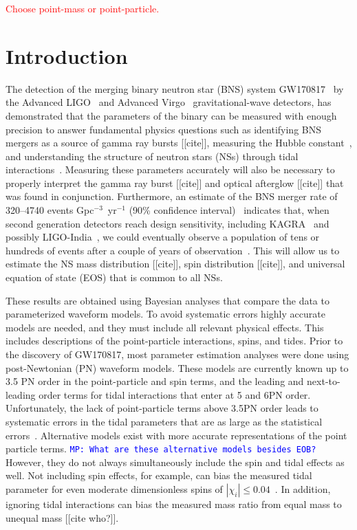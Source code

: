 \documentclass[prd,aps,letter,twocolumn,floatfix,notitlepage,nofootinbib]{revtex4-1}
\newcommand{\MP}[1]{{\textcolor{blue}{\texttt{MP: #1}} }}
\newcommand{\red}[1]{\textcolor{red}{#1}}
\begin{document}
\red{Choose point-mass or point-particle.}
\section{Introduction}

The detection of the merging binary neutron star (BNS) system GW170817~\cite{GW170817} by the Advanced LIGO~\cite{Harry2010} and Advanced Virgo~\cite{Acernese2009} gravitational-wave detectors, has demonstrated that the parameters of the binary can be measured with enough precision to answer fundamental physics questions such as identifying BNS mergers as a source of gamma ray bursts [[cite]], measuring the Hubble constant~\cite{GW170817Hubble}, and understanding the structure of neutron stars (NSs) through tidal interactions~\cite{GW170817}. Measuring these parameters accurately will also be necessary to properly interpret the gamma ray burst [[cite]] and optical afterglow [[cite]] that was found in conjunction. Furthermore, an estimate of the BNS merger rate of 320--4740 events Gpc$^{-3}$~yr$^{-1}$ (90\% confidence interval)~\cite{GW170817} indicates that, when second generation detectors reach design sensitivity, including KAGRA~\cite{Somiya2012} and possibly LIGO-India~\cite{IyerSouradeepUnnikrishnan2011}, we could eventually observe a population of tens or hundreds of events after a couple of years of observation~\cite{LIGORate2010}. This will allow us to estimate the NS mass distribution [[cite]], spin distribution [[cite]], and universal equation of state (EOS) that is common to all NSs\cite{DelPozzoLiAgathos2013, LackeyWade2015}. 

These results are obtained using Bayesian analyses that compare the data to parameterized waveform models. To avoid systematic errors highly accurate models are needed, and they must include all relevant physical effects. This includes descriptions of the point-particle interactions, spins, and tides. Prior to the discovery of GW170817, most parameter estimation analyses were done using post-Newtonian (PN) waveform models. These models are currently known up to 3.5 PN order in the point-particle and spin terms, and the leading and next-to-leading order terms for tidal interactions that enter at 5 and 6PN order. Unfortunately, the lack of point-particle terms above 3.5PN order leads to systematic errors in the tidal parameters that are as large as the statistical errors~\cite{Favata2014, YagiYunes2014, WadeCreightonOchsner2014}. Alternative models exist with more accurate representations of the point particle terms. \MP{What are these alternative models besides EOB?} However, they do not always simultaneously include the spin and tidal effects as well. Not including spin effects, for example, can bias the measured tidal parameter for even moderate dimensionless spins of $|\chi_i| \le 0.04$~\cite{Favata2014}. In addition, ignoring tidal interactions can bias the measured mass ratio from equal mass to unequal mass [[cite who?]].
\end{document}
